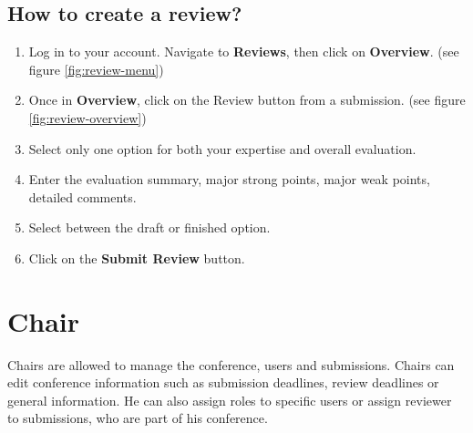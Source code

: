 \documentclass[nochapterpage,nopartpage,noheadingspace,numbersubsubsec,bigchapter,colorback,accentcolor=tud9c,10pt]{tudreport}
\begin{document}
	\section{How to create a review?}


\begin{enumerate}
	\item	Log in to your account. Navigate to \textbf{Reviews}, then click on \textbf{Overview}.  (see figure \ref{fig:review-menu})
	\item	Once in \textbf{Overview}, click on the {Review} button from a submission.  (see figure \ref{fig:review-overview})
	\item	Select only one option for both your expertise and overall evaluation.
	\item	Enter the evaluation summary, major strong points, major weak points, detailed comments.
	\item	Select between the draft or finished option.
	\item	Click on the \textbf{Submit Review} button.
\end{enumerate}


  \chapter{Chair}

Chairs are allowed to manage the conference, users and submissions. Chairs can edit conference information such as submission deadlines, review deadlines or general information. He can also assign roles to specific users or assign reviewer to submissions, who are part of his conference. 
\end{document}
